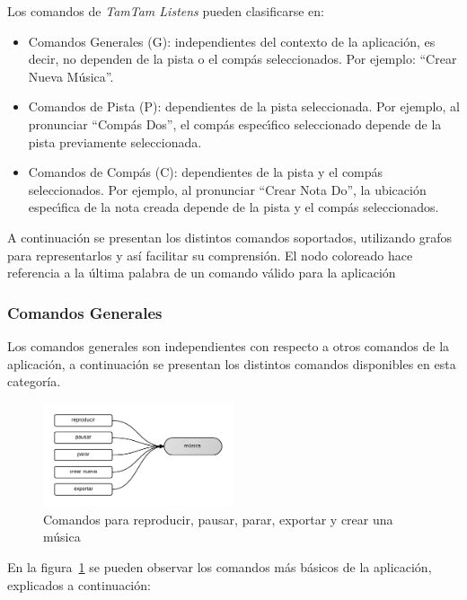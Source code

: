 Los comandos de \emph{TamTam Listens} pueden clasificarse en:

\begin{itemize}
    \item Comandos Generales (G): independientes del contexto de la aplicaci\'on, es decir, no dependen
    de la pista o el comp\'as seleccionados. Por ejemplo: ``Crear Nueva M\'usica''.
    \item Comandos de Pista (P): dependientes de la pista seleccionada. Por ejemplo, al pronunciar 
    ``Comp\'as Dos'', el comp\'as espec{\'\i}fico seleccionado depende de la pista 
    previamente seleccionada.
    \item Comandos de Comp\'as (C): dependientes de la pista y el comp\'as seleccionados. Por ejemplo, 
    al pronunciar ``Crear Nota Do'', la ubicaci\'on espec{\'\i}fica de la nota creada depende de la
    pista y el comp\'as seleccionados.
\end{itemize}


A continuaci\'on se presentan los distintos comandos soportados, utilizando grafos para representarlos y 
as\'i facilitar su comprensi\'on. El nodo coloreado hace referencia a la \'ultima palabra de un comando 
v\'alido para la aplicaci\'on

\subsubsection{Comandos Generales}

Los comandos generales son independientes con respecto a otros comandos de la aplicaci\'on, a continuaci\'on se presentan los distintos
comandos disponibles en esta categor\'ia. 
\begin{figure}[H] 
\centering
\includegraphics[width=0.5\textwidth]{./graphics/cmd-musica.png}
\caption{Comandos para reproducir, pausar, parar, exportar y crear una m\'usica}
\label{figure:cmd-crear-musica}
\end{figure}

En la figura~\ref{figure:cmd-crear-musica} se pueden observar los comandos m\'as b\'asicos
de la aplicaci\'on, explicados a continuaci\'on:

